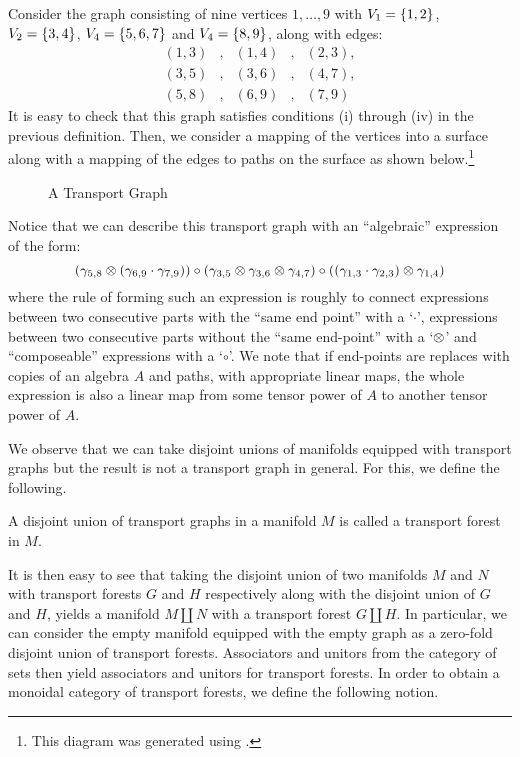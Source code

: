 \documentclass[./Thick_TQFTs_and_Quantum_Information.tex]{subfiles}
\begin{document}
\begin{exm}
Consider the graph consisting of nine vertices $1, \dots, 9$ with
$V_1 = \set{1, 2}$, $V_2 = \set{3, 4}$, $V_4 = \set{5, 6, 7}$ and
$V_4 = \set{8, 9}$, along with edges:
\[\begin{array}{ccccc}
  (1, 3) &,& (1, 4) &,& (2, 3),\\
  (3, 5) &,& (3, 6) &,& (4, 7),\\
  (5, 8) &,& (6, 9) &,& (7, 9)
\end{array}\]
It is easy to check that this graph satisfies conditions (i) through (iv) in the
previous definition. Then, we consider a mapping of the vertices into a surface
along with a mapping of the edges to paths on the surface as shown
below.\footnote{This diagram was generated using \cite{Mathcha}.}
\begin{figure}[H]
\begin{center}

\end{center}
\caption{A Transport Graph}
\end{figure}
Notice that we can describe this transport graph with an ``algebraic'' expression
of the form:
\[
  (\gamma_{5, 8} \otimes (\gamma_{6, 9} \cdot \gamma_{7, 9})) \circ
  (\gamma_{3, 5} \otimes \gamma_{3, 6} \otimes \gamma_{4, 7}) \circ
  ((\gamma_{1, 3} \cdot \gamma_{2, 3}) \otimes \gamma_{1, 4})
\]
where the rule of forming such an expression is roughly to connect
expressions between two consecutive parts with the ``same end point'' with a
`$\cdot$', expressions between two consecutive parts without the
``same end-point'' with a `$\otimes$' and ``composeable'' expressions with a
`$\circ$'. We note that if end-points are replaces with copies of an algebra $A$
and paths, with appropriate linear maps, the whole expression is also a linear
map from some tensor power of $A$ to another tensor power of $A$.
\end{exm}

We observe that we can take disjoint unions of manifolds equipped with transport
graphs but the result is not a transport graph in general. For this, we define
the following.

\begin{defn}
A disjoint union of transport graphs in a manifold $M$ is called a transport
forest in $M$.
\end{defn}

It is then easy to see that taking the disjoint union of two manifolds $M$ and
$N$ with transport forests $G$ and $H$ respectively along with the disjoint
union of $G$ and $H$, yields a manifold $M \amalg N$ with a transport forest
$G \amalg H$. In particular, we can consider the empty manifold equipped with
the empty graph as a zero-fold disjoint union of transport forests. Associators
and unitors from the category of sets then yield associators and unitors for
transport forests. In order to obtain a monoidal category of transport forests,
we define the following notion.
\end{document}
